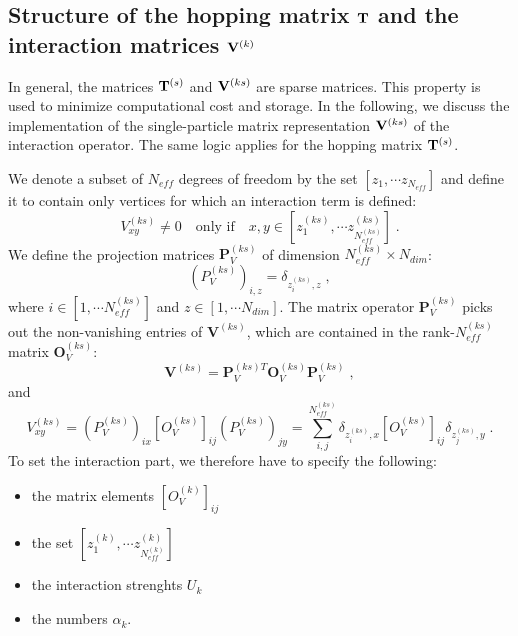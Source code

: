 \subsection{Structure of the hopping matrix  ${\bf T}$ and the interaction matrices ${\bf V}^{(k)}$}

In general, the matrices ${\bf T}^{(s)}$ and ${\bf V}^{(ks)}$ are sparse matrices. 
This property is used to minimize computational cost and storage.
In the following, we discuss the implementation of the single-particle matrix representation ${\bf V}^{(ks)}$ of the interaction operator. 
The same logic applies for the hopping matrix ${\bf T}^{(s)}$.

We denote a subset of $N_{eff}$  degrees of freedom  by the set  $[z_{1},\cdots  z_{N_{eff}}]$ and define it to contain only vertices for which an interaction term is defined:
\begin{equation}
V^{(ks)}_{x y}\neq 0\quad \text{only if} \quad x,y \in [z_{1}^{(ks)},\cdots  z_{N_{eff}^{(ks)}}^{(ks)}]\;.
\end{equation}
We define the projection matrices $\mathbf{P}^{(ks)}_{V}$ of dimension $N_{eff}^{(ks)}\times N_{dim}$:
\begin{equation}
(P_{V}^{(ks)})_{i,z}=\delta_{z_{i}^{(ks)},z}\;,
\end{equation}
where $i\in [1,\cdots N_{eff}^{(ks)}]$ and $z\in [1,\cdots N_{dim}]$. The matrix operator $\bm{P}^{(ks)}_{V}$ picks out the non-vanishing entries of $\bm{V}^{(ks)}$, 
which are contained in the rank-$N_{eff}^{(ks)}$  matrix $\bm{O}_{V}^{(ks)}$:
\begin{equation}
\bm{V}^{(ks)}=\bm{P}^{(ks) T}_{V} \bm{O}_{V}^{(ks)}\bm{P}^{(ks)}_{V}\;,
\end{equation}
and
\begin{equation}
V_{xy}^{(ks)}=(P^{(ks)}_{V})_{ix} \left[O_{V}^{(ks)}\right]_{ij}(P_{V}^{(ks)})_{jy}=\sum\limits_{i,j}^{N_{eff}^{(ks)}} \delta_{z_{i}^{(ks)},x}  \left[O_{V}^{(ks)}\right]_{ij} \delta_{z_{j}^{(ks)},y} \;.
\end{equation}
To set the  interaction part, we therefore have to specify the following:
\begin{itemize}
\item the matrix elements $\left[O_{V}^{(k)}\right]_{ij}$
\item the set $[z_{1}^{(k)},\cdots  z_{N_{eff}^{(k)}}^{(k)}]$ 
\item the interaction strenghts $U_{k}$
\item the numbers  $\alpha_{k}$.
\end{itemize}

